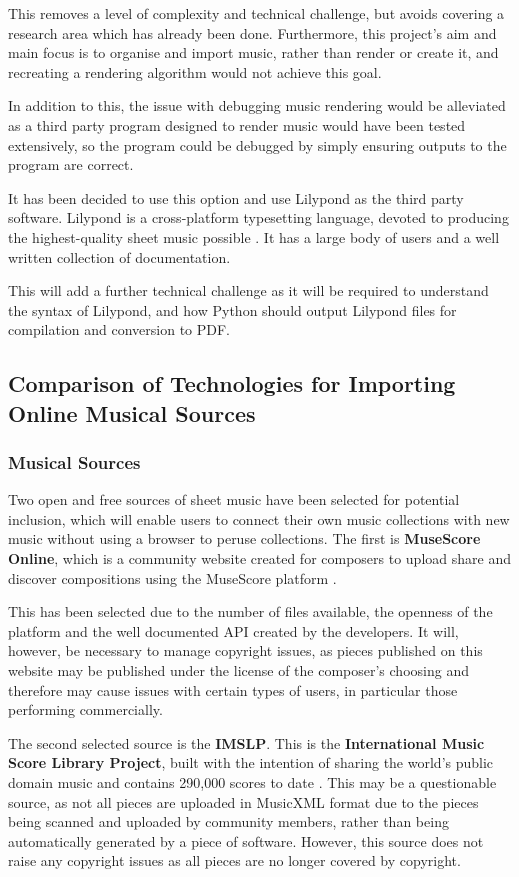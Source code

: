 This removes a level of complexity and technical challenge, but avoids covering a research area which has already been done. Furthermore, this project's aim and main focus is to organise and import music, rather than render or create it, and recreating a rendering algorithm would not achieve this goal.

In addition to this, the issue with debugging music rendering would be alleviated as a third party program designed to render music would have been tested extensively, so the program could be debugged by simply ensuring outputs to the program are correct.

It has been decided to use this option and use Lilypond as the third party software. Lilypond is a cross-platform typesetting language, devoted to producing the highest-quality sheet music possible \parencite{Lilypond}. It has a large body of users and a well written collection of documentation. 

This will add a further technical challenge as it will be required to understand the syntax of Lilypond, and how Python should output Lilypond files for compilation and conversion to PDF.

\subsection{Comparison of Technologies for Importing Online Musical Sources}
\subsubsection{Musical Sources}
Two open and free sources of sheet music have been selected for potential inclusion, which will enable users to connect their own music collections with new music without using a browser to peruse collections. The first is \textbf{MuseScore Online}, which is a community website created for composers to upload share and discover compositions using the MuseScore platform \parencite{MuseShare}.

This has been selected due to the number of files available, the openness of the platform and the well documented API created by the developers. It will, however, be necessary to manage copyright issues, as pieces published on this website may be published under the license of the composer's choosing and therefore may cause issues with certain types of users, in particular those performing commercially.

The second selected source is the \textbf{IMSLP}. This is the \textbf{International Music Score Library Project}, built with the intention of sharing the world’s public domain music and contains 290,000 scores to date \parencite{imslp}. This may be a questionable source, as not all pieces are uploaded in MusicXML format due to the pieces being scanned and uploaded by community members, rather than being automatically generated by a piece of software. However, this source does not raise any copyright issues as all pieces are no longer covered by copyright.

